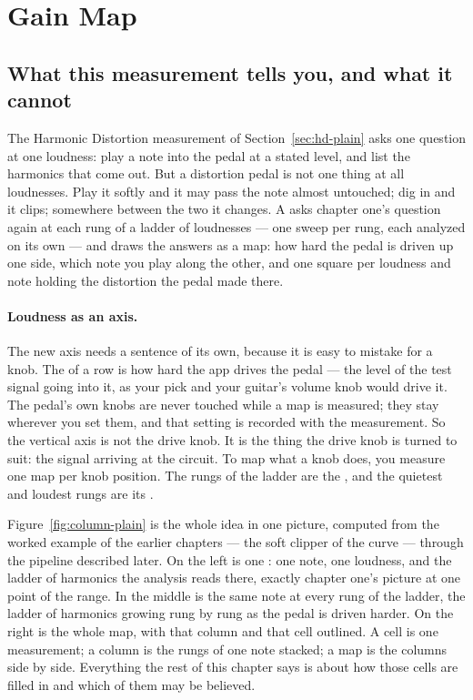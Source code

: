 \documentclass[11pt,a4paper]{article}
\begin{document}
\clearpage
\section{Gain Map}
\label{sec:journey-plain}

\subsection{What this measurement tells you, and what it cannot}

The Harmonic Distortion measurement of Section~\ref{sec:hd-plain} asks
one question at one loudness: play a note into the pedal at a stated
level, and list the harmonics that come out. But a distortion pedal is
not one thing at all loudnesses. Play it softly and it may pass the note
almost untouched; dig in and it clips; somewhere between the two it
changes. A  asks chapter one's question again at each rung
of a ladder of loudnesses --- one sweep per rung, each analyzed on its own
--- and draws the answers as a map: how hard the pedal is driven up one
side, which note you play along the other, and one square per loudness
and note holding the distortion the pedal made there.

\paragraph{Loudness as an axis.} The new axis needs a sentence of its
own, because it is easy to mistake for a knob. The  of a
row is how hard the app drives the pedal --- the level of the test signal
going into it, as your pick and your guitar's volume knob would drive it.
The pedal's own knobs are never touched while a map is measured; they
stay wherever you set them, and that setting is recorded with the
measurement. So the vertical axis is not the drive knob. It is the thing
the drive knob is turned to suit: the signal arriving at the circuit. To
map what a knob does, you measure one map per knob position. The rungs of
the ladder are the , and the quietest and loudest
rungs are its .

Figure~\ref{fig:column-plain} is the whole idea in one picture, computed
from the worked example of the earlier chapters --- the soft clipper of
the  curve --- through the pipeline described later. On the
left is one : one note, one loudness, and the ladder of
harmonics the analysis reads there, exactly chapter one's picture at one
point of the range. In the middle is the same note at every rung of the
ladder, the ladder of harmonics growing rung by rung as the pedal is
driven harder. On the right is the whole map, with that column and that
cell outlined. A cell is one measurement; a column is the rungs of one
note stacked; a map is the columns side by side. Everything the rest of
this chapter says is about how those cells are filled in and which of
them may be believed.
\end{document}
